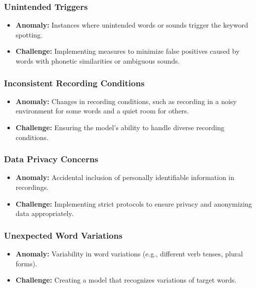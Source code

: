 \subsubsection{Unintended Triggers}

\begin{itemize}
	\item \textbf{Anomaly:} Instances where unintended words or sounds trigger the keyword spotting.
	\item \textbf{Challenge:} Implementing measures to minimize false positives caused by words with phonetic similarities or ambiguous sounds.
\end{itemize}

\subsubsection{Inconsistent Recording Conditions}

\begin{itemize}
	\item \textbf{Anomaly:} Changes in recording conditions, such as recording in a noisy environment for some words and a quiet room for others.
	\item \textbf{Challenge:} Ensuring the model's ability to handle diverse recording conditions.
\end{itemize}

\subsubsection{Data Privacy Concerns}

\begin{itemize}
	\item \textbf{Anomaly:} Accidental inclusion of personally identifiable information in recordings.
	\item \textbf{Challenge:} Implementing strict protocols to ensure privacy and anonymizing data appropriately.
\end{itemize}

\subsubsection{Unexpected Word Variations}

\begin{itemize}
	\item \textbf{Anomaly:} Variability in word variations (e.g., different verb tenses, plural forms).
	\item \textbf{Challenge:} Creating a model that recognizes variations of target words.
\end{itemize}

